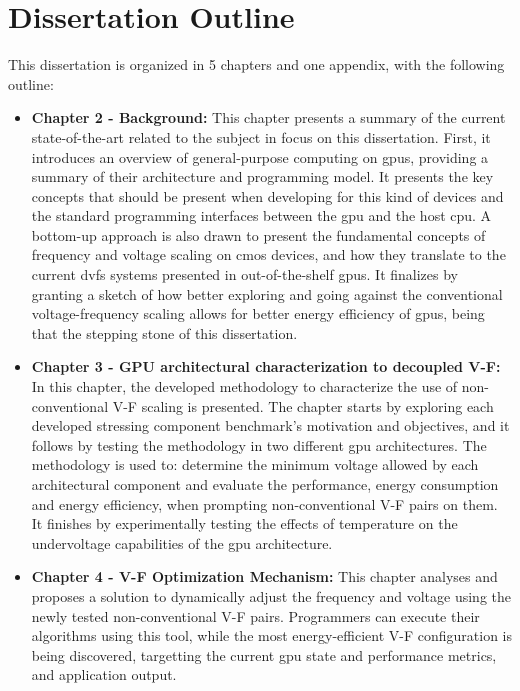 \section{Dissertation Outline}
\label{section:outline}

This dissertation is organized in 5 chapters and one appendix, with the following outline:
\begin{itemize}
    \item \textbf{Chapter 2 - Background:} This chapter presents a summary of the current state-of-the-art related to the subject in focus on this dissertation. First, it introduces an overview of general-purpose computing on \acrshort{gpu}s, providing a summary of their architecture and programming model. It presents the key concepts that should be present when developing for this kind of devices and the standard programming interfaces between the \acrshort{gpu} and the host  \acrshort{cpu}. A bottom-up approach is also drawn to present the fundamental concepts of frequency and voltage scaling on \acrshort{cmos} devices, and how they translate to the current \acrshort{dvfs} systems presented in out-of-the-shelf \acrshort{gpu}s. It finalizes by granting a sketch of how better exploring and going against the conventional voltage-frequency scaling allows for better energy efficiency of \acrshort{gpu}s, being that the stepping stone of this dissertation. 
    \item \textbf{Chapter 3 - GPU architectural characterization to decoupled V-F:} In this chapter, the developed methodology to characterize the use of non-conventional V-F scaling is presented. The chapter starts by exploring each developed stressing component benchmark's motivation and objectives, and it follows by testing the methodology in two different \acrshort{gpu} architectures. The methodology is used to: determine the minimum voltage allowed by each architectural component and evaluate the performance, energy consumption and energy efficiency, when prompting non-conventional V-F pairs on them. It finishes by experimentally testing the effects of temperature on the undervoltage capabilities of the \acrshort{gpu} architecture.
    \item \textbf{Chapter 4 - V-F Optimization Mechanism:} This chapter analyses and proposes a solution to dynamically adjust the frequency and voltage using the newly tested non-conventional V-F pairs. Programmers can execute their algorithms using this tool, while the most energy-efficient V-F configuration is being discovered, targetting the current \acrshort{gpu} state and performance metrics, and application output.

\end{itemize}
